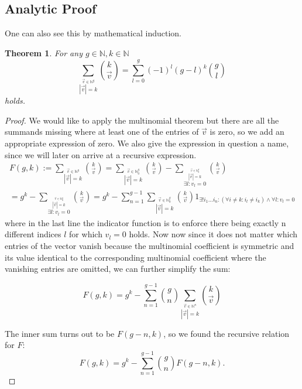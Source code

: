 \documentclass{article}
\theoremstyle{theorem}
\newtheorem{theorem}{Theorem}
\theoremstyle{definition}
\begin{document}
\subsection{Analytic Proof}

One can also see this by mathematical induction.

\begin{theorem}
For any \(g\in\mathbb{N},k\in\mathbb{N}\)
\begin{equation}
\sum_{\stackrel{\vec{v}\in\mathbb{N}^g}{|\vec{v}|=k}} \binom{k}{\vec{v}}=\sum_{l=0}^g (-1)^l (g-l)^k \binom{g}{l}
\end{equation}
holds.
\end{theorem}
\begin{proof}
We would like to apply the multinomial theorem but there are all the summands missing where at least
one of the entries of \(\vec{v}\) is zero, so we add an appropriate expression of zero. We also give the expression in
question a name, since we will later on arrive at a recursive expression.
\begin{multline}
F(g,k):=\sum_{\stackrel{\vec{v}\in\mathbb{N}^g}{|\vec{v}|=k}} \binom{k}{\vec{v}}
= \sum_{\stackrel{\vec{v}\in\mathbb{N}_0^g}{|\vec{v}|=k}} \binom{k}{\vec{v}}
- \sum_{\stackrel{\stackrel{\vec{v}\in\mathbb{N}_0^g}{|\vec{v}|=k}}{\exists l: v_l=0}} \binom{k}{\vec{v}}\\
= g^k 
 - \sum_{\stackrel{\stackrel{\vec{v}\in\mathbb{N}_0^g}{|\vec{v}|=k}}{\exists l: v_l=0}} \binom{k}{\vec{v}}
=g^k 
- \sum_{n=1}^{g-1} \sum_{\stackrel{\vec{v}\in\mathbb{N}_0^g}{|\vec{v}|=k}}
 \binom{k}{\vec{v}} 1_{\exists! i_1\dots i_n : \left(\forall i\neq k: i_l\neq i_k\right) \wedge \forall l :v_l=0}
\end{multline}
where in the last line the indicator function is to enforce there being exactly n different indices \(l\) for which \(v_l=0\)
holds. Now now since it does not matter which entries of the vector vanish because the multinomial coefficient 
is symmetric and its value identical to the corresponding multinomial coefficient where the vanishing entries
are omitted, we can further simplify the sum:

\begin{equation*}
F(g,k)= g^k -  \sum_{n=1}^{g-1} \binom{g}{n} \sum_{\stackrel{\vec{v}\in\mathbb{N}^n}{|\vec{v}|=k}}
 \binom{k}{\vec{v}}
\end{equation*}

The inner sum turns out to be \(F(g-n,k)\), so we found the recursive relation for \(F\):
\begin{equation}\label{combinatorics solution recursive}
F(g,k)= g^k -  \sum_{n=1}^{g-1} \binom{g}{n} F(g-n,k).
\end{equation}


\end{proof}
\end{document}
